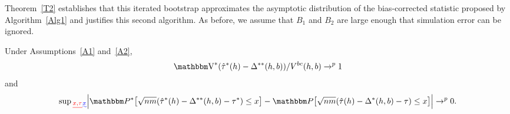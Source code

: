 \documentclass[12pt,fleqn]{article}
\providecommand{\DIFadd}[1]{{\protect\color{blue}\uwave{#1}}} %
\providecommand{\DIFdel}[1]{{\protect\color{red}\sout{#1}}}                      %
\providecommand{\DIFaddbegin}{} %
\providecommand{\DIFaddend}{} %
\providecommand{\DIFdelbegin}{} %
\providecommand{\DIFdelend}{} %
\begin{document}
Theorem~\ref{T2} establishes that this iterated bootstrap approximates the
asymptotic distribution of the bias-corrected statistic proposed by
Algorithm~\ref{Alg1} and justifies this second algorithm.  As before, we assume
that $B_1$ and $B_2$ are large enough that simulation error can be ignored.

\begin{theorem}\label{T2}
  Under Assumptions~\ref{A1} and~\ref{A2},
  \begin{equation*}
    \V^*(\hat\tau^{*}(h) - \Delta^{**}(h,b))/V^{bc}(h,b) \to^p 1
  \end{equation*}
  and
  \begin{equation*}
    \sup\DIFdelbegin \DIFdel{_{x,\tau}
    }\DIFdelend \DIFaddbegin \DIFadd{_{x}
    }\DIFaddend \Big\rvert \Pr^*\big[ \sqrt{nm}
    (\hat\tau^{*}(h) - \Delta^{**}(h,b) - \tau^*) \leq x \big]
    - \Pr\big[ \sqrt{nm}
    (\hat\tau(h) - \Delta^*(h,b) - \tau) \leq x \big] \Big\lvert \to^p 0.
  \end{equation*}
\end{theorem}
\end{document}
